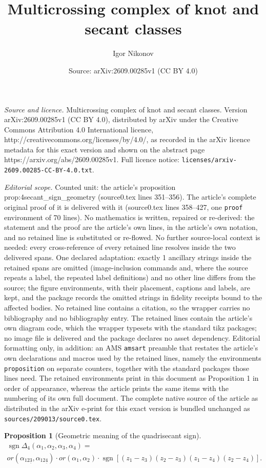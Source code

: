 \documentclass[10pt,a4paper]{amsart}
\title{Multicrossing complex of knot and secant classes}
\author{Igor Nikonov}
\date{Source: arXiv:2609.00285v1 (CC BY 4.0)}
\newtheorem{proposition}{Proposition}
\DeclareMathOperator{\sgn}{\mathrm{sgn}}
\begin{document}
\maketitle

\noindent\emph{Source and licence.} Multicrossing complex of knot and secant classes. Version arXiv:2609.00285v1 (CC BY 4.0), distributed by arXiv under the Creative Commons Attribution 4.0 International licence, http://creativecommons.org/licenses/by/4.0/, as recorded in the arXiv licence metadata for this exact version and shown on the abstract page https://arxiv.org/abs/2609.00285v1. Full licence notice: \texttt{licenses/arxiv-2609.00285-CC-BY-4.0.txt}.\par\smallskip

\noindent\textit{Editorial scope.} Counted unit: the article's proposition prop:4secant\_sign\_geometry (source0.tex lines 351--356). The article's complete original proof of it is delivered with it (source0.tex lines 358--427, one \texttt{proof} environment of 70 lines). No mathematics is written, repaired or re-derived: the statement and the proof are the article's own lines, in the article's own notation, and no retained line is substituted or re-flowed.  No further source-local context is needed: every cross-reference of every retained line resolves inside the two delivered spans.  One declared adaptation: exactly 1 ancillary strings inside the retained spans are omitted (image-inclusion commands and, where the source repeats a label, the repeated label definitions) and no other line differs from the source; the figure environments, with their placement, captions and labels, are kept, and the package records the omitted strings in fidelity receipts bound to the affected bodies.  No retained line contains a citation, so the wrapper carries no bibliography and no bibliography entry.  The retained lines contain the article's own diagram code, which the wrapper typesets with the standard tikz packages; no image file is delivered and the package declares no asset dependency.  Editorial formatting only, in addition: an AMS \texttt{amsart} preamble that restates the article's own declarations and macros used by the retained lines, namely the environments \texttt{proposition} on separate counters, together with the standard packages those lines need.  The retained environments print in this document as Proposition 1 in order of appearance, whereas the article prints the same items with the numbering of its own full document.  The complete native source of the article as distributed in the arXiv e-print for this exact version is bundled unchanged as \texttt{sources/209013/source0.tex}.
\begin{proposition}[Geometric meaning of the quadrisecant sign]\label{prop:4secant_sign_geometry}
\begin{multline*}
\sgn\Delta_4(\alpha_1,\alpha_2,\alpha_3,\alpha_4)=\\
or(\alpha_{12\underline{3}},\alpha_{12\underline{4}})\cdot or(\alpha_1,\alpha_2)\cdot\sgn[(z_1-z_3)(z_2-z_3)(z_1-z_4)(z_2-z_4)].
\end{multline*}
\end{proposition}
\end{document}
